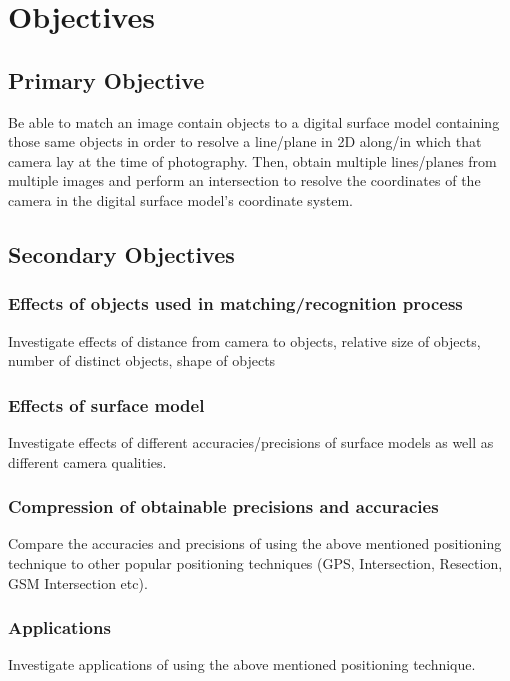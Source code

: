 

\section{Objectives}
\subsection{Primary Objective}
Be able to match an image contain objects to a digital surface model containing those same objects in order to resolve a line/plane in 2D along/in which that camera lay at the time of photography.
Then, obtain multiple lines/planes from multiple images and perform an intersection to resolve the coordinates of the camera in the digital surface model's coordinate system.

\subsection{Secondary Objectives}

\subsubsection{Effects of objects used in matching/recognition process}
Investigate effects of distance from camera to objects, relative size of objects, number of distinct objects, shape of objects

\subsubsection{Effects of surface model}
Investigate effects of different accuracies/precisions of surface models as well as different camera qualities.

\subsubsection{Compression of obtainable precisions and accuracies}
Compare the accuracies and precisions of using the above mentioned positioning technique to other popular positioning techniques (GPS, Intersection, Resection, GSM Intersection etc).

\subsubsection{Applications}
Investigate applications of using the above mentioned positioning technique.